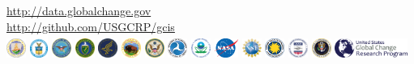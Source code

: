 \documentclass{beamer}
\begin{document}
\begin{frame}[plain]
\titlepage
\begin{center}
\url{http://data.globalchange.gov}\\
\url{http://github.com/USGCRP/gcis}\\
\medskip
\includegraphics[height=0.25in]{logo/USDA.eps}
\includegraphics[height=0.30in]{logo/DOC.eps}
\includegraphics[height=0.25in]{logo/DOD.eps}
\includegraphics[height=0.25in]{logo/DOE_logo.pdf}
\includegraphics[height=0.25in]{logo/HHS_logo.pdf}
\includegraphics[height=0.25in]{logo/DOI_logo.pdf}
\includegraphics[height=0.25in]{logo/DOS.eps}
\includegraphics[height=0.25in]{logo/DOT.eps}
\includegraphics[height=0.25in]{logo/EPA.eps}
\includegraphics[height=0.25in]{logo/NASA.eps}
\includegraphics[height=0.25in]{logo/NSF.eps}
\includegraphics[height=0.25in]{logo/SI.eps}
\includegraphics[height=0.25in]{logo/USAID_logo.pdf}
\includegraphics[height=0.25in]{logo/NSTC.eps}
\includegraphics[height=0.25in]{logo/USGCRP.eps}
\end{center}
\end{frame}
\end{document}
